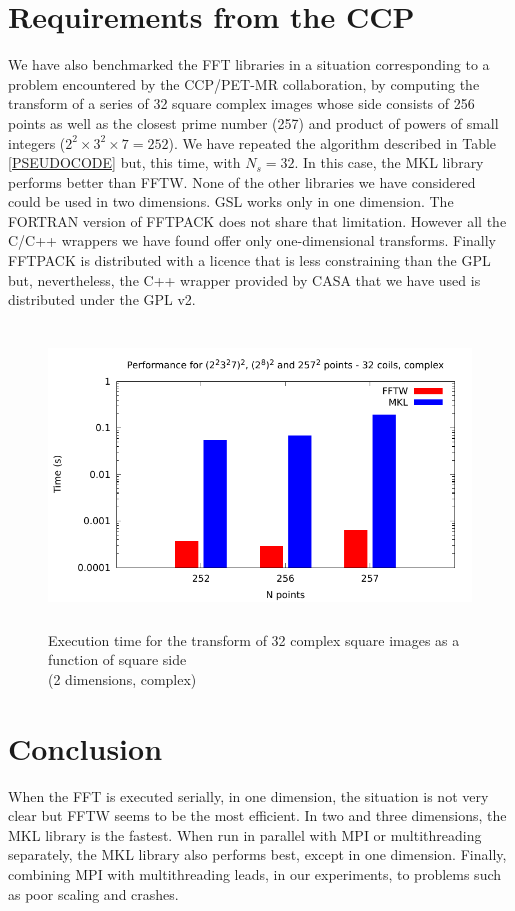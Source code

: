 \documentclass[12pt, a4paper]{article} \setlength{\textheight}{24cm}
\begin{document}
\section{Requirements from the CCP}\label{CCPPETMR}
We have also benchmarked the FFT libraries in a situation
corresponding to a problem encountered by the CCP/PET-MR
collaboration, by computing the transform of a series of 32 square
complex images whose side consists of 256 points as well as the
closest prime number (257) and product of powers of small integers
($2^2\times 3^2\times 7=252$). We have repeated the algorithm
described in Table \ref{PSEUDOCODE} but, this time, with $N_s=32$. In
this case, the MKL library performs better than FFTW. None of the
other libraries we have considered could be used in two dimensions.
GSL works only in one dimension. The FORTRAN version of FFTPACK does
not share that limitation. However all the C/C++ wrappers we have
found offer only one-dimensional transforms. Finally FFTPACK is
distributed with a licence that is less constraining than the GPL but,
nevertheless, the C++ wrapper provided by CASA that we have used is
distributed under the GPL v2.

\begin{figure}[H]
  \captionsetup{width=0.6\textwidth}
  \centering
  \includegraphics[height=8cm]{graphs/ccppetmr.pdf}
  \caption{Execution time for the transform of 32 complex square
    images as a function of square side\\(2 dimensions, complex)}
  \label{method}
\end{figure}
\section{Conclusion}
When the FFT is executed serially, in one dimension, the situation is
not very clear but FFTW seems to be the most efficient. In two and
three dimensions, the MKL library is the fastest. When run in parallel
with MPI or multithreading separately, the MKL library also performs
best, except in one dimension. Finally, combining MPI with
multithreading leads, in our experiments, to problems such as poor
scaling and crashes.
\end{document}
